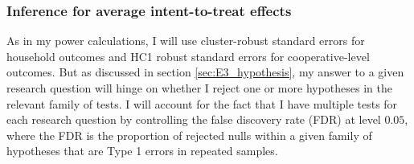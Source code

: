 \documentclass[11pt]{article}
\begin{document}
\subsubsection{Inference for average intent-to-treat effects}\label{sec:E3_mult.inf}
As in my power calculations, I will use cluster-robust standard errors for household outcomes and HC1 robust standard errors for cooperative-level outcomes. %
But as discussed in section \ref{sec:E3_hypothesis}, my answer to a given research question will hinge on whether I reject one or more hypotheses in the relevant family of tests. I will account for the fact that I have multiple tests for each research question by controlling the false discovery rate (FDR) at level $0.05$, where the FDR is the proportion of rejected nulls within a given family of hypotheses that are Type 1 errors in repeated samples. 
\end{document}
